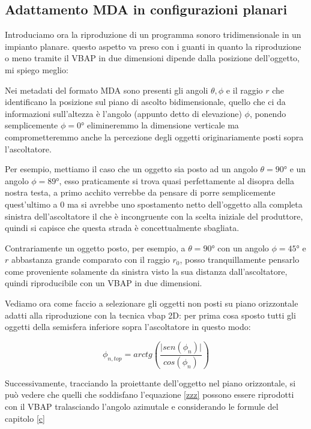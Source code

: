\documentclass[12pt,a4paper]{report}
\begin{document}
\subsection{Adattamento MDA in configurazioni planari}

Introduciamo ora la riproduzione di un programma sonoro tridimensionale in un impianto planare.  questo aspetto va preso con i guanti in quanto la riproduzione o meno tramite il VBAP in due dimensioni dipende dalla posizione dell'oggetto, mi spiego meglio:

Nei metadati del formato MDA sono presenti gli angoli $\theta, \phi$ e il raggio $r$ che identificano la posizione sul piano di ascolto bidimensionale, quello che ci da informazioni sull'altezza è l'angolo (appunto detto di elevazione) $\phi$, ponendo semplicemente $\phi=0°$ elimineremmo la dimensione verticale ma comprometteremmo anche la percezione degli oggetti originariamente posti sopra l'ascoltatore.

Per esempio, mettiamo il caso che un oggetto sia posto ad un angolo $	\theta= 90° $ e un angolo $\phi=89°$, esso praticamente si trova quasi perfettamente al disopra della nostra testa, a primo acchito verrebbe da pensare di porre semplicemente quest'ultimo a $0$ ma si avrebbe uno spostamento netto dell'oggetto alla completa sinistra dell'ascoltatore il che è incongruente con la scelta iniziale del produttore, quindi si capisce che questa strada è concettualmente sbagliata.

Contrariamente un oggetto posto, per esempio, a $\theta= 90°$ con un angolo $\phi=45°$ e $r$ abbastanza grande comparato con il raggio $r_0$, posso tranquillamente pensarlo come proveniente solamente da sinistra visto la sua distanza dall'ascoltatore, quindi riproducibile con un VBAP in due dimensioni.

Vediamo ora come faccio a selezionare gli oggetti non posti su piano orizzontale adatti alla riproduzione con la tecnica vbap 2D: per prima cosa sposto tutti gli oggetti della semisfera inferiore sopra l'ascoltatore in questo modo:

\begin{equation}
\phi_{n,top} = arctg  \left( \dfrac{\vert sen(\phi_n) \vert}{ cos(\phi_n) } \right)
\label{  b}
\end{equation}

Successivamente, tracciando la proiettante dell'oggetto nel piano orizzontale, si può vedere che quelli che soddisfano l'equazione \ref{zzz} possono essere riprodotti con il VBAP tralasciando l'angolo azimutale e considerando le formule del capitolo \ref{c}
\end{document}
